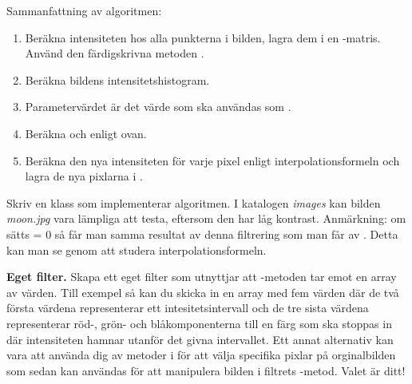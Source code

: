 Sammanfattning av algoritmen:
\begin{enumerate}
	\item Beräkna intensiteten hos alla punkterna i bilden, lagra dem i en -matris. Använd den färdigskrivna metoden .
	\item Beräkna bildens intensitetshistogram.
	\item Parametervärdet  är det värde som ska användas som .
	\item Beräkna  och  enligt ovan.
	\item Beräkna den nya intensiteten för varje pixel enligt interpolationsformeln och lagra de nya pixlarna i .
\end{enumerate}
Skriv en klass  som implementerar algoritmen. I katalogen \emph{images} kan bilden \emph{moon.jpg} vara lämpliga att testa, eftersom den har låg kontrast. Anmärkning: om  sätts = 0 så får man samma resultat av denna filtrering som man får av . Detta kan man se genom att studera interpolationsformeln.

\Task \textbf{Eget filter.} Skapa ett eget filter som utnyttjar att -metoden tar emot en array av värden. Till exempel så kan du skicka in en array med fem värden där de två första värdena representerar ett intesitetsintervall och de tre sista värdena representerar röd-, grön- och blåkomponenterna till en färg som ska stoppas in där intensiteten hamnar utanför det givna intervallet. Ett annat alternativ kan vara att använda dig av metoder i  för att välja specifika pixlar på orginalbilden som sedan kan användas för att manipulera bilden i filtrets -metod. Valet är ditt!
